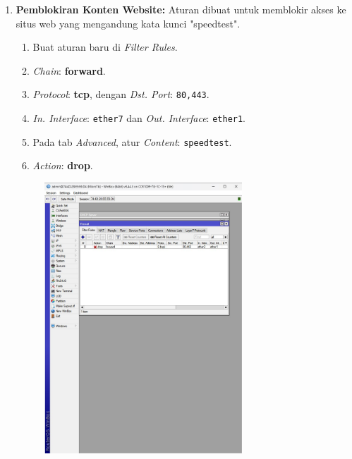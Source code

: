 \begin{enumerate}
    \item \textbf{Pemblokiran Konten Website:} Aturan dibuat untuk memblokir akses ke situs web yang mengandung kata kunci "speedtest".
    \begin{enumerate}
        \item Buat aturan baru di \textit{Filter Rules}.
        \item \textit{Chain}: \textbf{forward}.
        \item \textit{Protocol}: \textbf{tcp}, dengan \textit{Dst. Port}: \texttt{80,443}.
        \item \textit{In. Interface}: \texttt{ether7} dan \textit{Out. Interface}: \texttt{ether1}.
        \item Pada tab \textit{Advanced}, atur \textit{Content}: \texttt{speedtest}.
        \item \textit{Action}: \textbf{drop}.
    \end{enumerate}
    \begin{figure}[H]
        \centering
        \includegraphics[width=0.7\textwidth]{img4/FireWallBlock.jpeg}

\end{figure}
\end{enumerate}
